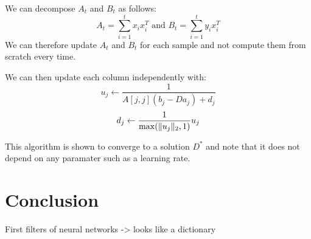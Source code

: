 \documentclass[a4paper,11pt]{article}
\DeclarePairedDelimiter\norm{\lVert}{\rVert} %
\begin{document}
We can decompose $A_t$ and $B_t$ as follows:
$$ A_t = \sum\limits_{i=1}^t x_i x_i^T \text{ and } B_t = \sum\limits_{i=1}^t y_i x_i^T $$
We can therefore update $A_t$ and $B_t$ for each sample and not compute them from scratch every time.

We can then update each column independently with:
$$ u_j \leftarrow \frac{1}{A[j,j](b_j - D a_j) + d_j} $$
$$ d_j \leftarrow \frac{1}{\max(\norm{u_j}_2, 1)} u_j $$

This algorithm is shown to converge to a solution $D^*$ and note that it does not depend on any paramater such as a learning rate.

\section{Conclusion}
First filters of neural networks -> looks like a dictionary
\end{document}
